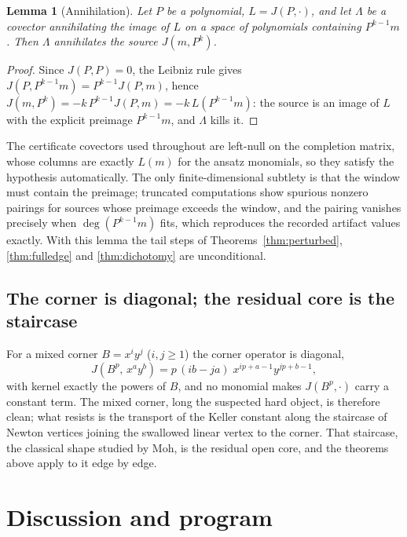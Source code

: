 \documentclass[11pt]{article}
\newtheorem{lemma}[theorem]{Lemma}
\theoremstyle{definition}
\theoremstyle{remark}
\begin{document}
\begin{lemma}[Annihilation]\label{lem:annihilation}
Let $P$ be a polynomial, $L = J(P, \cdot)$, and let $\Lambda$ be a covector annihilating the
image of $L$ on a space of polynomials containing $P^{k-1} m$. Then $\Lambda$ annihilates
the source $J(m, P^{k})$.
\end{lemma}

\begin{proof}
Since $J(P,P) = 0$, the Leibniz rule gives $J(P, P^{k-1} m) = P^{k-1} J(P, m)$, hence
$J(m, P^{k}) = -k\,P^{k-1} J(P,m) = -k\,L\!\left(P^{k-1} m\right)$: the source is an image of
$L$ with the explicit preimage $P^{k-1} m$, and $\Lambda$ kills it.
\end{proof}

The certificate covectors used throughout are left-null on the completion matrix, whose
columns are exactly $L(m)$ for the ansatz monomials, so they satisfy the hypothesis
automatically. The only finite-dimensional subtlety is that the window must contain the
preimage; truncated computations show spurious nonzero pairings for sources whose preimage
exceeds the window, and the pairing vanishes precisely when $\deg(P^{k-1}m)$ fits, which
reproduces the recorded artifact values exactly. With this lemma the tail steps of
Theorems~\ref{thm:perturbed}, \ref{thm:fulledge} and \ref{thm:dichotomy} are unconditional.

\subsection*{The corner is diagonal; the residual core is the staircase}

For a mixed corner $B = x^i y^j$ ($i, j \ge 1$) the corner operator is diagonal,
\[
J\!\left(B^{p},\, x^{a} y^{b}\right) = p\,(ib - ja)\; x^{ip + a - 1} y^{jp + b - 1},
\]
with kernel exactly the powers of $B$, and no monomial makes $J(B^p, \cdot)$ carry a constant
term. The mixed corner, long the suspected hard object, is therefore clean; what resists is
the transport of the Keller constant along the staircase of Newton vertices joining the
swallowed linear vertex to the corner. That staircase, the classical shape studied by Moh, is
the residual open core, and the theorems above apply to it edge by edge.

\section{Discussion and program}
\end{document}
